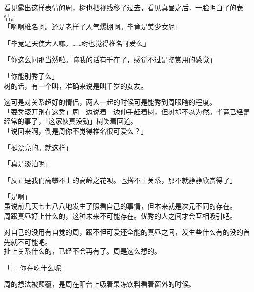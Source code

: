 看见露出这样表情的周，树也把视线移了过去，看见真昼之后，一脸明白了的表情。\\

「啊啊椎名啊。还是老样子人气爆棚啊。毕竟是美少女呢」

「毕竟是天使大人嘛。……树也觉得椎名可爱么」

「你这么问那当然啦。嘛我的话有千在了，感觉不过是鉴赏用的感觉」

「你能别秀了么」\\

树的话，有一个叫，准确来说是叫千岁的女友。

这可是对关系超好的情侣，两人一起的时候可是能秀到周眼瞎的程度。\\

「要秀滚开别在这秀」周一边说着一边伸手赶着树，但树却不以为然。毕竟已经是经常的事了，「这家伙真没劲」树笑着回道。\\

「说回来啊，倒是周你不觉得椎名很可爱么？」

「挺漂亮的。就这样」

「真是淡泊呢」

「反正是我们高攀不上的高岭之花呗。也搭不上关系，那不就静静欣赏得了」

「是啊」\\

虽说前几天七七八八地发生了照看自己的事情，但本来就是次元不同的存在。\\

周跟真昼好上什么的，这种未来不可能存在。优秀的人之间才会互相吸引吧。

对自己的没用有自觉的周，跟不但可爱还全能的真昼之间，发生些什么有的没的首先就不可能吧。\\

扯上关系什么的，已经不会再有了。周是这么想的。\\

\vspace{2\baselineskip}

「……你在吃什么呢」

周的想法被颠覆，是周在阳台上吸着果冻饮料看着窗外的时候。
